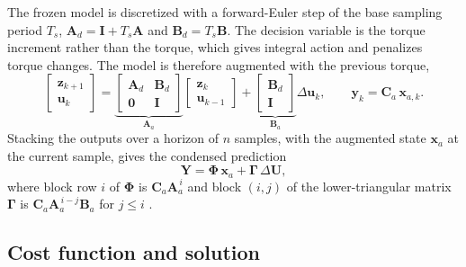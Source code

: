 \documentclass[11pt,a4paper]{article}
\numberwithin{equation}{section}
\newcommand{\vect}[1]{\mathbf{#1}}
\begin{document}
The frozen model is discretized with a forward-Euler step of the base sampling period $T_s$, $\vect{A}_d=\vect{I}+T_s\vect{A}$ and $\vect{B}_d=T_s\vect{B}$. The decision variable is the torque increment rather than the torque, which gives integral action and penalizes torque changes. The model is therefore augmented with the previous torque,
\begin{equation}
\boxed{
\begin{bmatrix}\vect{z}_{k+1}\\ \vect{u}_{k}\end{bmatrix}=
\underbrace{\begin{bmatrix}\vect{A}_d&\vect{B}_d\\ \vect{0}&\vect{I}\end{bmatrix}}_{\vect{A}_a}
\begin{bmatrix}\vect{z}_{k}\\ \vect{u}_{k-1}\end{bmatrix}+
\underbrace{\begin{bmatrix}\vect{B}_d\\ \vect{I}\end{bmatrix}}_{\vect{B}_a}\Delta\vect{u}_k,
\qquad \vect{y}_k=\vect{C}_a\,\vect{x}_{a,k}.}
\end{equation}
Stacking the outputs over a horizon of $n$ samples, with the augmented state $\vect{x}_a$ at the current sample, gives the condensed prediction
\begin{equation}
\vect{Y}=\boldsymbol{\Phi}\,\vect{x}_a+\boldsymbol{\Gamma}\,\Delta\vect{U},
\end{equation}
where block row $i$ of $\boldsymbol{\Phi}$ is $\vect{C}_a\vect{A}_a^{\,i}$ and block $(i,j)$ of the lower-triangular matrix $\boldsymbol{\Gamma}$ is $\vect{C}_a\vect{A}_a^{\,i-j}\vect{B}_a$ for $j\le i$ \cite{wang2009}.

\subsection{Cost function and solution}
\end{document}
